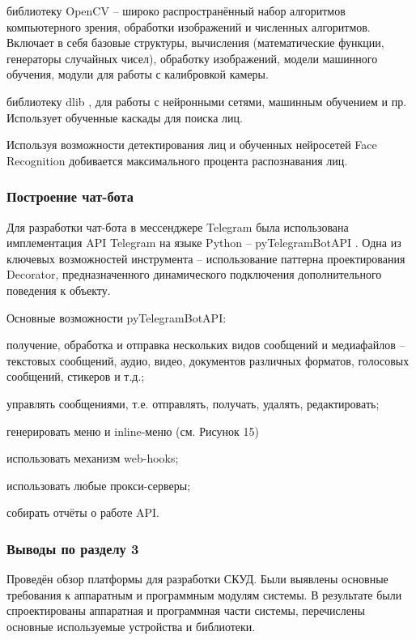 \begin{itemize*}
  \item библиотеку OpenCV \cite{opencv} -- широко распространённый набор алгоритмов компьютерного зрения, обработки изображений и численных алгоритмов. Включает в себя базовые структуры, вычисления (математические функции, генераторы случайных чисел), обработку изображений, модели машинного обучения, модули для работы с калибровкой камеры.
  \item библиотеку dlib \cite{dlib}, для работы с нейронными сетями, машинным обучением и пр. Использует обученные каскады для поиска лиц.
\end{itemize*}

Используя возможности детектирования лиц и обученных нейросетей Face Recognition добивается максимального процента распознавания лиц.

\subsubsection{Построение чат-бота}
Для разработки чат-бота в мессенджере Telegram была использована имплементация
API Telegram на языке Python -- pyTelegramBotAPI \cite{telebot}. Одна из ключевых возможностей инструмента -- использование паттерна проектирования Decorator, предназначенного динамического подключения дополнительного поведения к объекту.

Основные возможности pyTelegramBotAPI:

\begin{itemize*}
\item получение, обработка и отправка нескольких видов сообщений и медиафайлов -- текстовых сообщений, аудио, видео, документов различных форматов, голосовых сообщений, стикеров и т.д.;
\item управлять сообщениями, т.е. отправлять, получать, удалять, редактировать;
\item генерировать меню и inline-меню (см. Рисунок 15)
\item использовать механизм web-hooks;
\item использовать любые прокси-серверы;
\item собирать отчёты о работе API.
\end{itemize*}

\subsubsection{Выводы по разделу 3}

Проведён обзор платформы для разработки СКУД. Были выявлены основные требования к аппаратным и программным модулям системы. В результате были спроектированы аппаратная и программная части системы, перечислены основные используемые устройства и библиотеки.

